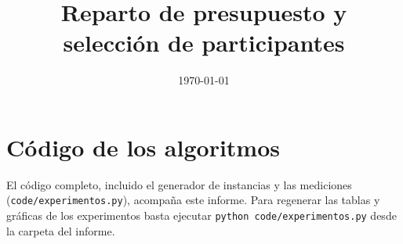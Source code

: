 \documentclass{estilo}
\title{Reparto de presupuesto y\protect\\ selección de participantes}
\date{\today}
\begin{document}
\maketitle

\justifying{}

\newpage
\tableofcontents
\newpage

\newpage

\newpage

\newpage

\newpage

\newpage


\newpage
\appendix
\section{Código de los algoritmos}\label{anexo:codigo}
El código completo, incluido el generador de instancias y las mediciones (\texttt{code/experimentos.py}), acompaña este informe. Para regenerar las tablas y gráficas de los experimentos basta ejecutar \texttt{python code/experimentos.py} desde la carpeta del informe.


\newpage
\printbibliography[title={Referencias}]
\end{document}

